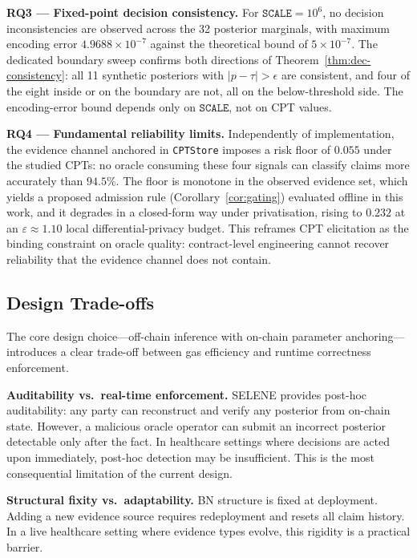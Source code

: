 \documentclass[journal]{IEEEtran}
\theoremstyle{definition}
\theoremstyle{remark}
\begin{document}
\textbf{RQ3 --- Fixed-point decision consistency.}
For $\texttt{SCALE}=10^6$, no decision inconsistencies
are observed across the 32 posterior marginals, with
maximum encoding error $4.9688\times10^{-7}$ against the
theoretical bound of $5\times10^{-7}$. The dedicated
boundary sweep confirms both directions of
Theorem~\ref{thm:dec-consistency}: all 11 synthetic
posteriors with $|p-\tau|>\epsilon$ are consistent, and
four of the eight inside or on the boundary are not, all
on the below-threshold side. The encoding-error bound
depends only on $\texttt{SCALE}$, not on CPT values.

\textbf{RQ4 --- Fundamental reliability limits.}
Independently of implementation, the evidence channel
anchored in \texttt{CPTStore} imposes a risk floor of
$0.055$ under the studied CPTs: no oracle consuming these
four signals can classify claims more accurately than
$94.5\%$. The floor is monotone in the observed evidence
set, which yields a proposed admission rule
(Corollary~\ref{cor:gating}) evaluated offline in this
work, and it degrades in a
closed-form way under privatisation, rising to $0.232$ at
an $\varepsilon{\approx}1.10$ local differential-privacy
budget. This reframes CPT elicitation as the binding
constraint on oracle quality: contract-level engineering
cannot recover reliability that the evidence channel does
not contain.

\subsection{Design Trade-offs}

The core design choice---off-chain inference with
on-chain parameter anchoring---introduces a clear
trade-off between gas efficiency and runtime
correctness enforcement.

\textbf{Auditability vs.\ real-time enforcement.}
SELENE provides post-hoc auditability: any party can
reconstruct and verify any posterior from on-chain
state. However, a malicious oracle operator can
submit an incorrect posterior detectable only after
the fact. In healthcare settings where decisions are
acted upon immediately, post-hoc detection may be
insufficient. This is the most consequential
limitation of the current design.

\textbf{Structural fixity vs.\ adaptability.}
BN structure is fixed at deployment. Adding a new
evidence source requires redeployment and resets all
claim history. In a live healthcare setting where
evidence types evolve, this rigidity is a practical
barrier.
\end{document}
